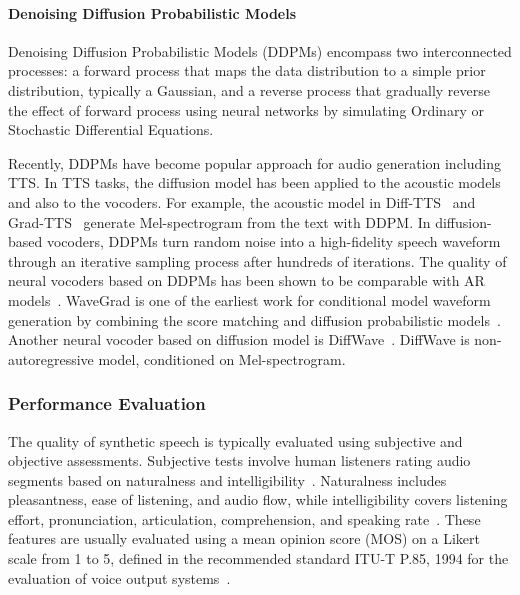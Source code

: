 

\paragraph{Denoising Diffusion Probabilistic Models}

Denoising Diffusion Probabilistic Models (DDPMs) encompass two interconnected processes: a forward process that maps the data distribution to a simple prior distribution, typically a Gaussian, and a reverse process that gradually reverse the effect of forward process using neural networks by simulating Ordinary or Stochastic Differential Equations.

Recently, DDPMs have become popular approach for audio generation including TTS. In TTS tasks, the diffusion model has been applied to the acoustic models and also to the vocoders. For example, the acoustic model in Diff-TTS~\cite{diff-tts} and Grad-TTS~\cite{grad-tts} generate Mel-spectrogram from the text with DDPM. In diffusion-based vocoders, DDPMs turn random noise into a high-fidelity speech waveform through an iterative sampling process after hundreds of iterations. The quality of neural vocoders based on DDPMs has been shown to be comparable with AR models~\cite{wavefit}. WaveGrad is one of the earliest work for conditional model waveform generation by combining the score matching and diffusion probabilistic models~\cite{wavegrad}. Another neural vocoder based on diffusion model is DiffWave~\cite{diffwave}. DiffWave is non-autoregressive model, conditioned on Mel-spectrogram. 


\subsubsection{Performance Evaluation}


The quality of synthetic speech is typically evaluated using subjective and objective assessments. Subjective tests involve human listeners rating audio segments based on naturalness and intelligibility~\cite{king2014, electronics20}. Naturalness includes pleasantness, ease of listening, and audio flow, while intelligibility covers listening effort, pronunciation, articulation, comprehension, and speaking rate~\cite{articlemos}. These features are usually evaluated using a mean opinion score (MOS) on a Likert scale from 1 to 5, defined in the recommended standard ITU-T P.85, 1994 for the evaluation of voice output systems~\cite{itu_p85}.

